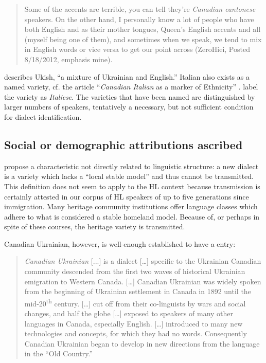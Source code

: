 \documentclass[output=paper]{LSP/langsci}
\begin{document}
\begin{quote}
Some of the accents are terrible, you can tell they’re \textit{Canadian cantonese} speakers. On the other hand, I personally know a lot of people who have both English and  as their mother tongues, Queen’s English accents and all (myself being one of them), and sometimes when we speak, we tend to mix in English words or vice versa to get our point across (ZeroHiei, Posted 8/18/2012, emphasis mine).
\end{quote}

\citet[71]{struk_between_2000} describes Ukish, “a mixture of Ukrainian and English.” Italian also exists as a named variety, cf. the article “\textit{Canadian Italian} as a marker of Ethnicity” \citep{danesi_canadian_1983,danesi_canadian_1984}. \citet{giovanardi_inglese_2003} label the variety as \textit{Italiese}. The varieties that have been named are distinguished by larger numbers of speakers, tentatively a necessary, but not sufficient condition for dialect identification.

\subsection{Social or demographic attributions ascribed}

\citet{auer_birth_2004} propose a characteristic not directly related to linguistic structure: a new dialect is a variety which lacks a “local stable model” and thus cannot be transmitted. This definition does not seem to apply to the HL context because transmission is certainly attested in our corpus of HL speakers of up to five generations since immigration. Many heritage community institutions offer language classes which adhere to what is considered a stable homeland model. Because of, or perhaps in spite of these courses, the heritage variety is transmitted. 

Canadian Ukrainian, however, is well-enough established to have a \citet{wikipedia_canadian_2014} entry:

\begin{quote}
\textit{Canadian Ukrainian}\textit{ }[...] is a dialect […] specific to the Ukrainian Canadian community descended from the first two waves of historical Ukrainian emigration to Western Canada. […] Canadian Ukrainian was widely spoken from the beginning of Ukrainian settlement in Canada in 1892 until the mid-20\textsuperscript{th} century. […] cut off from their co-linguists by wars and social changes, and half the globe […] exposed to speakers of many other languages in Canada, especially English. […] introduced to many new technologies and concepts, for which they had no words. Consequently Canadian Ukrainian began to develop in new directions from the language in the “Old Country.”  
\end{quote}
\end{document}
